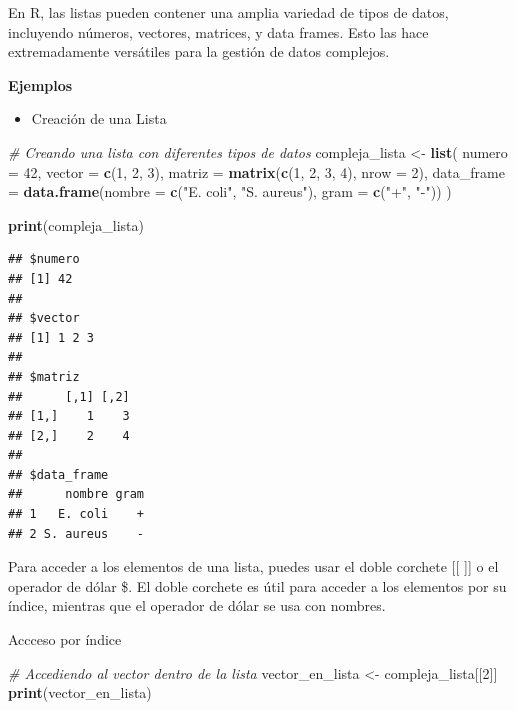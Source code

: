 \documentclass[
]{book}
\newenvironment{Shaded}{\begin{snugshade}}{\end{snugshade}}
\newcommand{\AttributeTok}[1]{\textcolor[rgb]{0.13,0.29,0.53}{#1}}
\newcommand{\CommentTok}[1]{\textcolor[rgb]{0.56,0.35,0.01}{\textit{#1}}}
\newcommand{\DecValTok}[1]{\textcolor[rgb]{0.00,0.00,0.81}{#1}}
\newcommand{\FunctionTok}[1]{\textcolor[rgb]{0.13,0.29,0.53}{\textbf{#1}}}
\newcommand{\NormalTok}[1]{#1}
\newcommand{\OtherTok}[1]{\textcolor[rgb]{0.56,0.35,0.01}{#1}}
\newcommand{\StringTok}[1]{\textcolor[rgb]{0.31,0.60,0.02}{#1}}
\providecommand{\tightlist}{%
  \setlength{\itemsep}{0pt}\setlength{\parskip}{0pt}}
\begin{document}
En R, las listas pueden contener una amplia variedad de tipos de datos, incluyendo números, vectores, matrices, y data frames. Esto las hace extremadamente versátiles para la gestión de datos complejos.

\textbf{Ejemplos}

\begin{itemize}
\tightlist
\item
  Creación de una Lista
\end{itemize}

\begin{Shaded}
\begin{Highlighting}[]
\CommentTok{\# Creando una lista con diferentes tipos de datos}
\NormalTok{compleja\_lista }\OtherTok{\textless{}{-}} \FunctionTok{list}\NormalTok{(}
  \AttributeTok{numero =} \DecValTok{42}\NormalTok{,}
  \AttributeTok{vector =} \FunctionTok{c}\NormalTok{(}\DecValTok{1}\NormalTok{, }\DecValTok{2}\NormalTok{, }\DecValTok{3}\NormalTok{),}
  \AttributeTok{matriz =} \FunctionTok{matrix}\NormalTok{(}\FunctionTok{c}\NormalTok{(}\DecValTok{1}\NormalTok{, }\DecValTok{2}\NormalTok{, }\DecValTok{3}\NormalTok{, }\DecValTok{4}\NormalTok{), }\AttributeTok{nrow =} \DecValTok{2}\NormalTok{),}
  \AttributeTok{data\_frame =} \FunctionTok{data.frame}\NormalTok{(}\AttributeTok{nombre =} \FunctionTok{c}\NormalTok{(}\StringTok{"E. coli"}\NormalTok{, }\StringTok{"S. aureus"}\NormalTok{), }\AttributeTok{gram =} \FunctionTok{c}\NormalTok{(}\StringTok{"+"}\NormalTok{, }\StringTok{"{-}"}\NormalTok{))}
\NormalTok{)}

\FunctionTok{print}\NormalTok{(compleja\_lista)}
\end{Highlighting}
\end{Shaded}

\begin{verbatim}
## $numero
## [1] 42
## 
## $vector
## [1] 1 2 3
## 
## $matriz
##      [,1] [,2]
## [1,]    1    3
## [2,]    2    4
## 
## $data_frame
##      nombre gram
## 1   E. coli    +
## 2 S. aureus    -
\end{verbatim}

Para acceder a los elementos de una lista, puedes usar el doble corchete {[}{[} {]}{]} o el operador de dólar \$. El doble corchete es útil para acceder a los elementos por su índice, mientras que el operador de dólar se usa con nombres.

Accceso por índice

\begin{Shaded}
\begin{Highlighting}[]
\CommentTok{\# Accediendo al vector dentro de la lista}
\NormalTok{vector\_en\_lista }\OtherTok{\textless{}{-}}\NormalTok{ compleja\_lista[[}\DecValTok{2}\NormalTok{]]}
\FunctionTok{print}\NormalTok{(vector\_en\_lista)}
\end{Highlighting}
\end{Shaded}
\end{document}
